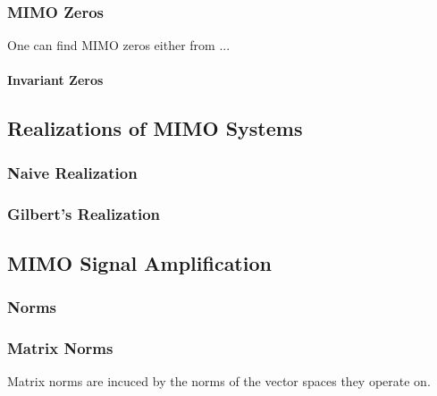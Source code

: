 \subsubsection{MIMO Zeros}
One can find MIMO zeros either from ...
\paragraph{Invariant Zeros}

\subsection{Realizations of MIMO Systems}
\subsubsection{Naive Realization}
\subsubsection{Gilbert's Realization}


\subsection{MIMO Signal Amplification}
\subsubsection{Norms}



\subsubsection{Matrix Norms}
Matrix norms are incuced by the norms of the vector spaces they operate on.




